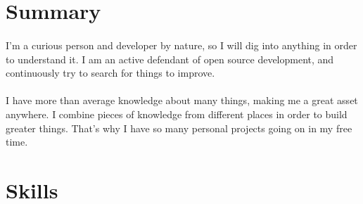 \documentclass{curriculum}
\author{Rolf Vidar {\bfseries Mazunki} Hoksaas}
\date{}
\begin{document}
	\maketitle

	\section{Summary}
	\paragraph{} I'm a curious person and developer by nature, so I will dig into anything in order to understand it. I am an active defendant of open source development, and continuously try to search for things to improve. 
	\paragraph{} I have more than average knowledge about many things, making me a great asset anywhere. I combine pieces of knowledge from different places in order to build greater things. That's why I have so many personal projects going on in my free time.

	\section{Skills}
\end{document}
